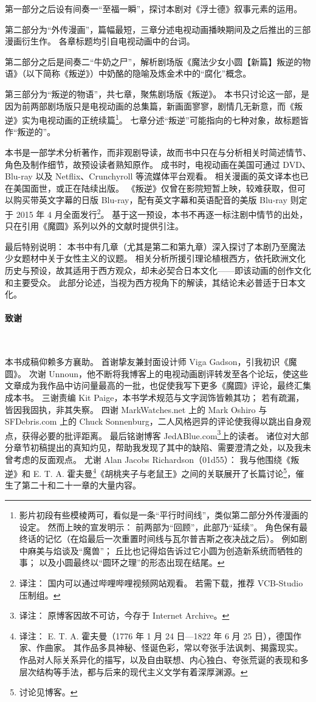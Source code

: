 第一部分之后设有间奏一“至福一瞬”，探讨本剧对《浮士德》叙事元素的运用。

第二部分为“外传漫画”，篇幅最短，三章分述电视动画播映期间及之后推出的三部漫画衍生作。
各章标题均引自电视动画中的台词。

第二部分之后是间奏二“牛奶之尸”，解析剧场版《魔法少女小圆【新篇】叛逆的物语》（以下简称《叛逆》）中奶酪的隐喻及炼金术中的“腐化”概念。

第三部分为“叛逆的物语”，共七章，聚焦剧场版《叛逆》。
本书只讨论这一部，是因为前两部剧场版只是电视动画的总集篇，新画面寥寥，剧情几无新意，而《叛逆》实为电视动画的正统续篇\footnote{%
    影片初段有些模棱两可，看似是一条“平行时间线”，类似第二部分外传漫画的设定。
    然而上映的宣发明示：
    前两部为“回顾”，此部乃“延续”。
    角色保有最终话的记忆（在焰最后一次重置时间线与瓦尔普吉斯之夜决战之后）。
    例如剧中麻美与焰谈及“魔兽”；
    丘比也记得焰告诉过它小圆为创造新系统而牺牲的事；
    以及小圆最终以“圆环之理”的形态出现在结尾。
}\cite{ref8}。
七章分述“叛逆”可能指向的七种对象，故标题皆作“叛逆的\underline{\makebox[1cm]{}}”。

本书是一部学术分析著作，而非观剧导读，故而书中只在与分析相关时简述情节、角色及制作细节，故预设读者熟知原作。
成书时，电视动画在美国可通过 DVD、Blu-ray 以及 Netflix、Crunchyroll 等流媒体平台观看。
相关漫画的英文译本也已在美国面世，或正在陆续出版。
《叛逆》仅曾在影院短暂上映，较难获取，但可以购买带英文字幕的日版 Blu-ray，配有英文字幕和英语配音的美版 Blu-ray 则定于 2015 年 4 月全面发行\footnote{%
    译注：
    国内可以通过哔哩哔哩视频网站观看。
    若需下载，推荐 VCB-Studio 压制组。
}。
基于这一预设，本书不再逐一标注剧中情节的出处，只在引用《魔圆》系列以外的文献时提供引注。

最后特别说明：
本书中有几章（尤其是第二和第九章）深入探讨了本剧乃至魔法少女题材中关于女性主义的议题。
相关分析所援引理论植根西方，依托欧洲文化历史与预设，故其适用于西方观众，却未必契合日本文化——即该动画的创作文化和主要受众。
此部分论述，当视为西方视角下的解读，其结论未必普适于日本文化。
\paragraph{致谢}~{}

本书成稿仰赖多方襄助。
首谢挚友兼封面设计师 Viga Gadson，引我初识《魔圆》。
次谢 Unnoun，他不断将我博客上的电视动画剧评转发至各个论坛，使这些文章成为我作品中访问量最高的一批，也促使我写下更多《魔圆》评论，最终汇集成本书。
三谢责编 Kit Paige，本书学术规范与文字润饰皆赖其功；
若有疏漏，皆因我固执，非其失察。
四谢 MarkWatches.net 上的 Mark Oshiro 与 SFDebris.com 上的 Chuck Sonnenburg，二人风格迥异的评论使我得以跳出自身观点，获得必要的批评距离。
最后铭谢博客 JedABlue.com\footnote{%
    译注：
    原博客因故不可访，今存于 Internet Archive。
}上的读者。
诸位对大部分章节初稿提出的真知灼见，帮助我发现了其中的缺陷、需要澄清之处，以及我未曾考虑的反面观点。
尤谢 Alan Jacobs Richardson（01d55）：
我与他围绕《叛逆》和 E. T. A. 霍夫曼\footnote{%
    译注：
    E. T. A. 霍夫曼（1776 年 1 月 24 日—1822 年 6 月 25 日），德国作家、作曲家。
    其作品多具神秘、怪诞色彩，常以夸张手法讽刺、揭露现实。
    作品对人际关系异化的描写，以及自由联想、内心独白、夸张荒诞的表现和多层次结构等手法，都与后来的现代主义文学有着深厚渊源。
}《胡桃夹子与老鼠王》之间的关联展开了长篇讨论\footnote{%
    讨论见博客。
}\cite{ref9}，催生了第二十和二十一章的大量内容。
